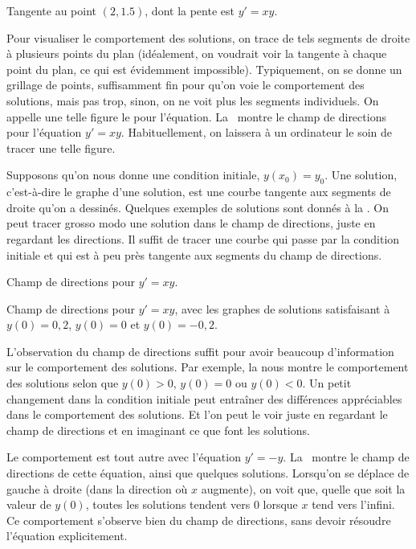 \begin{myfig}
\capstart
{}
\caption{Tangente au point $(2,1.5)$, dont la pente est $y'=xy$.\label{1.3:fig0}}
\end{myfig}

Pour visualiser le comportement des solutions, on trace de tels segments de droite à plusieurs points du plan (idéalement, on voudrait voir la tangente à chaque point du plan, ce qui est évidemment impossible).  Typiquement, on se donne un grillage de points, suffisamment fin pour qu'on voie le comportement des solutions, mais pas trop, sinon, on ne voit plus les segments individuels.  On appelle une telle figure le \emph{} pour l'équation.
La~ montre le champ de directions pour l'équation  $y' = xy$.
Habituellement, on laissera à un ordinateur le soin de tracer une telle figure.

Supposons qu'on nous donne une condition initiale, $y(x_0) = y_0$.  Une solution, c'est-à-dire le graphe d'une solution, est une courbe tangente aux segments de droite qu'on a dessinés.  Quelques exemples de solutions sont donnés à la  .  On peut tracer grosso modo une solution dans le champ de directions, juste en regardant les directions.  Il suffit de tracer une courbe qui passe par la condition initiale et qui est à peu près tangente aux segments du champ de directions.

\begin{myfig}
\parbox[t]{3.0in}{
 \capstart
 \caption{Champ de directions pour $y' = xy$.\label{1.3:fig1}}
}
\quad
\parbox[t]{3.0in}{
 \capstart
 \caption{Champ de directions pour $y' = xy$, avec les graphes de solutions satisfaisant à $y(0) = 0,2$, $y(0) = 0$ et $y(0) = -0,2$.\label{1.3:fig2}}
}
\end{myfig}
L'observation du champ de directions suffit pour avoir beaucoup d'information sur le comportement des solutions.  Par exemple, la  nous montre le comportement des solutions selon que $y(0) > 0$, $y(0) = 0$ ou $y(0) < 0$.  Un petit changement dans la condition initiale peut entraîner des différences appréciables dans le comportement des solutions.  Et l'on peut le voir juste en regardant le champ de directions et en imaginant ce que font les solutions.

Le comportement est tout autre avec l'équation $y' = -y$.  La~ montre le champ de directions de cette équation, ainsi que quelques solutions.  Lorsqu'on se déplace de gauche à droite (dans la direction où $x$ augmente), on voit que, quelle que soit la valeur de $y(0)$, toutes les solutions tendent vers 0 lorsque $x$ tend vers l'infini.  Ce comportement s'observe bien du champ de directions, sans devoir résoudre l'équation explicitement.

